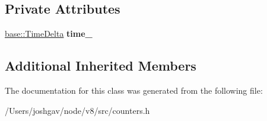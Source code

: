 \subsection*{Private Attributes}
\begin{DoxyCompactItemize}
\item 
\hyperlink{classv8_1_1base_1_1_time_delta}{base\+::\+Time\+Delta} {\bfseries time\+\_\+}\hypertarget{classv8_1_1internal_1_1_aggregatable_histogram_timer_a90f4009c8b97572bfb5fc3b802c9f1e1}{}\label{classv8_1_1internal_1_1_aggregatable_histogram_timer_a90f4009c8b97572bfb5fc3b802c9f1e1}

\end{DoxyCompactItemize}
\subsection*{Additional Inherited Members}


The documentation for this class was generated from the following file\+:\begin{DoxyCompactItemize}
\item 
/\+Users/joshgav/node/v8/src/counters.\+h\end{DoxyCompactItemize}
